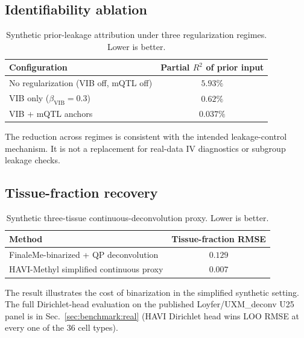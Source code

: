 \subsection*{Identifiability ablation}
\begin{table}[htbp]
\centering\small
\caption{Synthetic prior-leakage attribution under three regularization regimes. Lower is better.}
\label{tab:ext-ident}
\begin{tabular}{lc}
\toprule
Configuration & Partial $R^2$ of prior input \\
\midrule
No regularization (VIB off, mQTL off) & $5.93\%$ \\
VIB only ($\beta_{\mathrm{VIB}}=0.3$) & $0.62\%$ \\
VIB + mQTL anchors & $0.037\%$ \\
\bottomrule
\end{tabular}
\end{table}

The reduction across regimes is consistent with the intended leakage-control mechanism. It is not a replacement for real-data IV diagnostics or subgroup leakage checks.

\subsection*{Tissue-fraction recovery}
\begin{table}[htbp]
\centering\small
\caption{Synthetic three-tissue continuous-deconvolution proxy. Lower is better.}
\label{tab:ext-tissue}
\begin{tabular}{lc}
\toprule
Method & Tissue-fraction RMSE \\
\midrule
FinaleMe-binarized + QP deconvolution & $0.129$ \\
HAVI-Methyl simplified continuous proxy & $0.007$ \\
\bottomrule
\end{tabular}
\end{table}

The result illustrates the cost of binarization in the simplified synthetic setting. The full Dirichlet-head evaluation on the published Loyfer/UXM\_deconv U25 panel is in Sec.~\ref{sec:benchmark:real} (HAVI Dirichlet head wins LOO RMSE at every one of the $36$ cell types).

